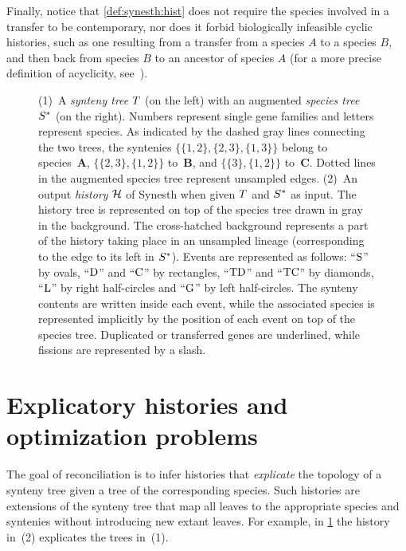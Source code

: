 Finally, notice that \cref{def:synesth:hist} does not require the species involved in a transfer to be contemporary, nor does it forbid biologically infeasible cyclic histories, such as one resulting from a transfer from a species \(A\) to a species \(B\), and then back from species \(B\) to an ancestor of species \(A\)
(for a more precise definition of acyclicity, see~\textcite{Tofigh2011SimultaneousIdentificationDuplications}).

\begin{figure}[htbp]
    \capstart
    \centering
    
    \caption[Input and possible scenario for the Synesth model]{
        (1)~A \emph{synteny tree} \(T\) (on the left) with an augmented \emph{species tree} \(S^*\) (on the right).
        Numbers represent single gene families and letters represent species.
        As indicated by the dashed gray lines connecting the two trees, the syntenies \(\{\{1,2\}, \{2,3\}, \{1,3\}\}\) belong to species~\textbf{A}, \(\{\{2,3\},\{1,2\}\}\) to~\textbf{B}, and \(\{\{3\},\{1,2\}\}\) to~\textbf{C}.
        Dotted lines in the augmented species tree represent unsampled edges.
        (2)~An output \emph{history} \(\mathcal{H}\) of Synesth when given \(T\) and \(S^*\) as input.
        The history tree is represented on top of the species tree drawn in gray in the background.
        The cross-hatched background represents a part of the history taking place in an unsampled lineage (corresponding to the edge to its left in \(S^*\)).
        Events are represented as follows: \enquote{\(\mathrm{S}\)} by ovals, \enquote{\(\mathrm{D}\)} and \enquote{\(\mathrm{C}\)} by rectangles, \enquote{\(\mathrm{TD}\)} and \enquote{\(\mathrm{TC}\)} by diamonds, \enquote{\(\mathrm{L}\)} by right half-circles and \enquote{\(\mathrm{G}\)} by left half-circles.
        The synteny contents are written inside each event, while the associated species is represented implicitly by the position of each event on top of the species tree.
        Duplicated or transferred genes are underlined, while fissions are represented by a slash.
        \label{fig:synesth:example}
    }
\end{figure}

\section{Explicatory histories and optimization problems}\label{sec:synesth:opt-probs}

The goal of reconciliation is to infer histories that \emph{explicate} the topology of a synteny tree given a tree of the corresponding species.
Such histories are extensions of the synteny tree that map all leaves to the appropriate species and syntenies without introducing new extant leaves.
For example, in \cref{fig:synesth:example} the history in~(2) explicates the trees in~(1).

